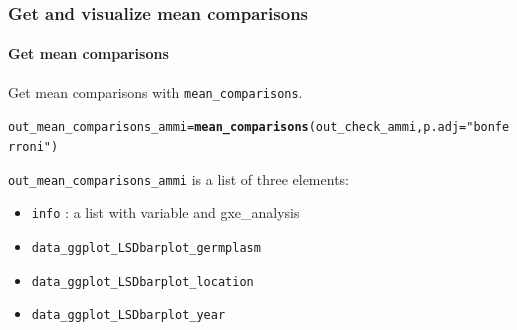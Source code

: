 \documentclass{book}\usepackage[]{graphicx}\usepackage[]{color}
\makeatletter
\newcommand{\hlstr}[1]{\textcolor[rgb]{0.192,0.494,0.8}{#1}}%
\newcommand{\hlopt}[1]{\textcolor[rgb]{0,0,0}{#1}}%
\newcommand{\hlstd}[1]{\textcolor[rgb]{0.345,0.345,0.345}{#1}}%
\newcommand{\hlkwb}[1]{\textcolor[rgb]{0.69,0.353,0.396}{#1}}%
\newcommand{\hlkwc}[1]{\textcolor[rgb]{0.333,0.667,0.333}{#1}}%
\newcommand{\hlkwd}[1]{\textcolor[rgb]{0.737,0.353,0.396}{\textbf{#1}}}%
\newenvironment{kframe}{%
 \def\at@end@of@kframe{}%
 \ifinner\ifhmode%
  \def\at@end@of@kframe{\end{minipage}}%
  \begin{minipage}{\columnwidth}%
 \fi\fi%
 \def\FrameCommand##1{\hskip\@totalleftmargin \hskip-\fboxsep
 \colorbox{shadecolor}{##1}\hskip-\fboxsep
     \hskip-\linewidth \hskip-\@totalleftmargin \hskip\columnwidth}%
 \MakeFramed {\advance\hsize-\width
   \@totalleftmargin\z@ \linewidth\hsize
   \@setminipage}}%
 {\par\unskip\endMakeFramed%
 \at@end@of@kframe}
\newenvironment{knitrout}{}{} %
\makeatother
\begin{document}


\subsubsection{Get and visualize mean comparisons}

\paragraph{Get mean comparisons}

Get mean comparisons with \texttt{mean\_comparisons}.

\begin{knitrout}
\color{fgcolor}\begin{kframe}
\begin{alltt}
\hlstd{out_mean_comparisons_ammi} \hlkwb{=} \hlkwd{mean_comparisons}\hlstd{(out_check_ammi,} \hlkwc{p.adj} \hlstd{=} \hlstr{"bonferroni"}\hlstd{)}
\end{alltt}
\end{kframe}
\end{knitrout}

\texttt{out\_mean\_comparisons\_ammi} is a list of three elements:

\begin{itemize}
\item \texttt{info} : a list with variable and gxe\_analysis
\item \texttt{data\_ggplot\_LSDbarplot\_germplasm}
\item \texttt{data\_ggplot\_LSDbarplot\_location}
\item \texttt{data\_ggplot\_LSDbarplot\_year}
\end{itemize}
\end{document}
